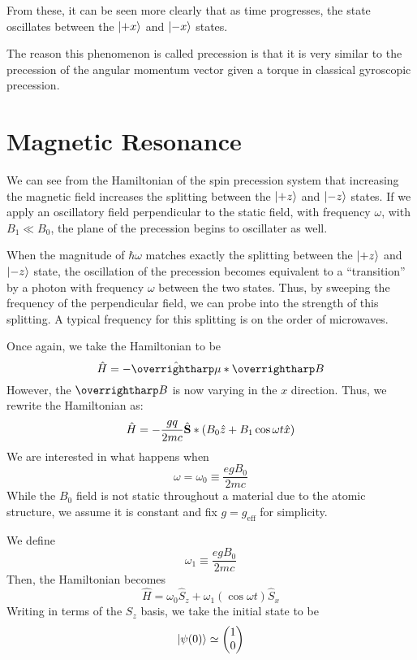 From these, it can be seen more clearly that as time progresses, the state oscillates between the \(\lvert+x\rangle\) and \(\lvert-x\rangle\) states.

The reason this phenomenon is called precession is that it is very similar to the precession of the angular momentum vector given a torque in classical gyroscopic precession. 

\section{Magnetic Resonance}
We can see from the Hamiltonian of the spin precession system that increasing the magnetic field increases the splitting between the \(\lvert+z\rangle\) and \(\lvert-z\rangle\) states. If we apply an oscillatory field perpendicular to the static field, with frequency \(\omega\), with \(B_1\ll B_0\), the plane of the precession begins to oscillater as well. 

When the magnitude of \(\hbar\omega\) matches exactly the splitting between the \(\lvert+z\rangle\) and \(\lvert-z\rangle\) state, the oscillation of the precession becomes equivalent to a ``transition'' by a photon with frequency \(\omega\) between the two states. Thus, by sweeping the frequency of the perpendicular field, we can probe into the strength of this splitting. A typical frequency for this splitting is on the order of microwaves.

Once again, we take the Hamiltonian to be
\[\hat{H}=-\hat{\vv{\mu}}*\vv{B}\]
However, the \(\vv{B}\) is now varying in the \(x\) direction. Thus, we rewrite the Hamiltonian as:
\begin{equation}
	\hat{H}=-\frac{gq}{2mc}\hat{\mathbf{S}}*\left(B_0\hat z + B_1\cos\omega t \hat{x}\right)
\end{equation}
We are interested in what happens when
\[\omega=\omega_0\equiv\frac{egB_0}{2mc}\]
While the \(B_0\) field is not static throughout a material due to the atomic structure, we assume it is constant and fix \(g=g_{\text{eff}}\) for simplicity.

We define 
\begin{equation}
	\omega_1\equiv\frac{egB_0}{2mc}
\end{equation}
Then, the Hamiltonian becomes
\begin{equation}
	\hat{H}=\omega_0\hat{S}_z+\omega_1\left(\cos\omega t\right)\hat{S}_x
\end{equation}
Writing in terms of the \(S_z\) basis, we take the initial state to be
\[\lvert\psi(0)\rangle\simeq \begin{pmatrix}
	1\\0
\end{pmatrix}\]

